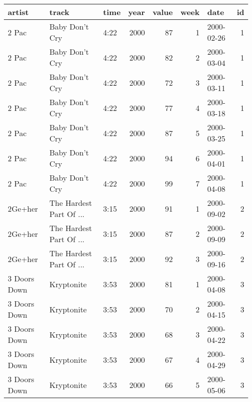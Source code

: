 \begin{tabular}{lllrrrlr}
  \toprule
 artist & track & time & year & value & week & date & id \\ 
  \midrule
  2 Pac & Baby Don't Cry & 4:22 & 2000 &  87 &   1 & 2000-02-26 &   1 \\ 
  2 Pac & Baby Don't Cry & 4:22 & 2000 &  82 &   2 & 2000-03-04 &   1 \\ 
  2 Pac & Baby Don't Cry & 4:22 & 2000 &  72 &   3 & 2000-03-11 &   1 \\ 
  2 Pac & Baby Don't Cry & 4:22 & 2000 &  77 &   4 & 2000-03-18 &   1 \\ 
  2 Pac & Baby Don't Cry & 4:22 & 2000 &  87 &   5 & 2000-03-25 &   1 \\ 
  2 Pac & Baby Don't Cry & 4:22 & 2000 &  94 &   6 & 2000-04-01 &   1 \\ 
  2 Pac & Baby Don't Cry & 4:22 & 2000 &  99 &   7 & 2000-04-08 &   1 \\ 
  2Ge+her & The Hardest Part Of ... & 3:15 & 2000 &  91 &   1 & 2000-09-02 &   2 \\ 
  2Ge+her & The Hardest Part Of ... & 3:15 & 2000 &  87 &   2 & 2000-09-09 &   2 \\ 
  2Ge+her & The Hardest Part Of ... & 3:15 & 2000 &  92 &   3 & 2000-09-16 &   2 \\ 
  3 Doors Down & Kryptonite & 3:53 & 2000 &  81 &   1 & 2000-04-08 &   3 \\ 
  3 Doors Down & Kryptonite & 3:53 & 2000 &  70 &   2 & 2000-04-15 &   3 \\ 
  3 Doors Down & Kryptonite & 3:53 & 2000 &  68 &   3 & 2000-04-22 &   3 \\ 
  3 Doors Down & Kryptonite & 3:53 & 2000 &  67 &   4 & 2000-04-29 &   3 \\ 
  3 Doors Down & Kryptonite & 3:53 & 2000 &  66 &   5 & 2000-05-06 &   3 \\ 
   \bottomrule
\end{tabular}
